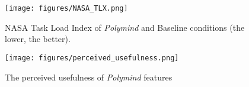 \begin{figure}[ht!]
\centering
\begin{minipage}[b]{.48\linewidth}
    \vspace{0pt}
    \texttt{[image: figures/NASA\_TLX.png]}
    \caption{NASA Task Load Index of \textit{Polymind} and Baseline conditions (the lower, the better).}
    \label{fig:usability}
\end{minipage}
\begin{minipage}[b]{.5\linewidth}
    \vspace{0pt}
    \texttt{[image: figures/perceived\_usefulness.png]}
    \caption{The perceived usefulness of \textit{Polymind} features}
    \label{fig:usefulness}
\end{minipage}
\end{figure}
